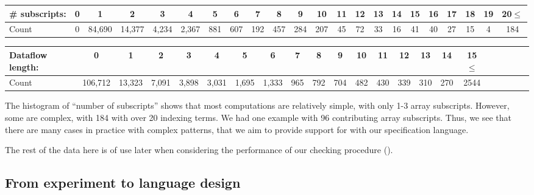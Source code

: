 
   \begin{center}     \begin{tabular}{l|ccccccccccccccccccccc}
   \textbf{\# subscripts}: & 0 & 1     & 2     & 3    &
                                                                       4
     & 5   & 6   & 7   & 8   & 9   & 10  & 11 & 12 & 13 & 14 & 15 & 16
     & 17 & 18 & 19 & 20$\leq$ \\\hline
   Count & 0 & 84,690 & 14,377 & 4,234 & 2,367 & 881 & 607 & 192 & 457 & 284 & 207 & 45 & 72 & 33 & 16 & 41 & 40 & 27 & 15 & 4  & 184
   \end{tabular}
\end{center}
   
 \begin{center}
\begin{tabular}{l|ccccccccccccccccccccc}
  \textbf{Dataflow length}: & 0      & 1     & 2    & 3
  & 4    & 5 & 6    & 7   & 8   & 9   & 10  & 11  & 12  & 13  & 14
  & 15$\leq$ \\\hline
  Count & 106,712 & 13,323 & 7,091 & 3,898 & 3,031 & 1,695 & 1,333 & 965 & 792 & 704 & 482 & 430 & 339 & 310 & 270 & 2544
\end{tabular}
\end{center}
%
The histogram of ``number of subscripts'' shows that most
computations are relatively simple, with only 1-3 array subscripts.
However, some are complex, with 184 with over 20 indexing terms. We had one example with 96
contributing array subscripts. Thus, we see that there are many cases
in practice with complex patterns, that we aim to provide support for
with our specification language.

The rest of the data here is of use later when considering the
performance of our checking procedure ().

\subsection{From experiment to language design}

